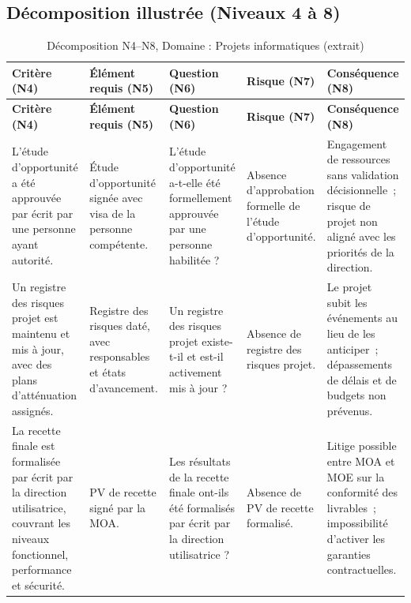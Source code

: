 \subsection{Décomposition illustrée (Niveaux 4 à 8)}
\begin{longtable}{>{\raggedright\arraybackslash}p{3.2cm}
                  >{\raggedright\arraybackslash}p{3cm}
                  >{\raggedright\arraybackslash}p{2.8cm}
                  >{\raggedright\arraybackslash}p{2.6cm}
                  >{\raggedright\arraybackslash}p{2.8cm}}

\caption{Décomposition N4--N8, Domaine : Projets informatiques (extrait)} \\

\toprule
\textbf{Critère (N4)} & \textbf{Élément requis (N5)} & \textbf{Question (N6)} & \textbf{Risque (N7)} & \textbf{Conséquence (N8)} \\
\midrule
\endfirsthead

\toprule
\textbf{Critère (N4)} & \textbf{Élément requis (N5)} & \textbf{Question (N6)} & \textbf{Risque (N7)} & \textbf{Conséquence (N8)} \\
\midrule
\endhead

\bottomrule
\endlastfoot

L'étude d'opportunité a été approuvée par écrit par une personne ayant autorité. &
Étude d'opportunité signée avec visa de la personne compétente. &
L'étude d'opportunité a-t-elle été formellement approuvée par une personne habilitée ? &
Absence d'approbation formelle de l'étude d'opportunité. &
Engagement de ressources sans validation décisionnelle~; risque de projet non aligné avec les priorités de la direction. \\

\addlinespace

Un registre des risques projet est maintenu et mis à jour, avec des plans d'atténuation assignés. &
Registre des risques daté, avec responsables et états d'avancement. &
Un registre des risques projet existe-t-il et est-il activement mis à jour ? &
Absence de registre des risques projet. &
Le projet subit les événements au lieu de les anticiper~; dépassements de délais et de budgets non prévenus. \\

\addlinespace

La recette finale est formalisée par écrit par la direction utilisatrice, couvrant les niveaux fonctionnel, performance et sécurité. &
PV de recette signé par la MOA. &
Les résultats de la recette finale ont-ils été formalisés par écrit par la direction utilisatrice ? &
Absence de PV de recette formalisé. &
Litige possible entre MOA et MOE sur la conformité des livrables~; impossibilité d'activer les garanties contractuelles. \\


\end{longtable}
